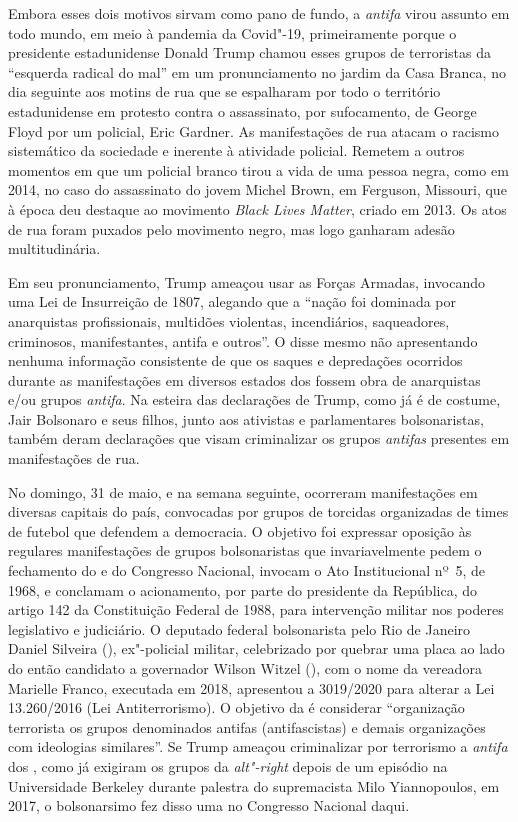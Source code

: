 Embora esses dois motivos sirvam como pano de fundo, a \emph{antifa}
virou assunto em todo mundo, em meio à pandemia da Covid"-19,
primeiramente porque o presidente estadunidense Donald Trump chamou
esses grupos de terroristas da ``esquerda radical do mal'' em um
pronunciamento no jardim da Casa Branca, no dia seguinte aos motins de
rua que se espalharam por todo o território estadunidense em protesto
contra o assassinato, por sufocamento, de George Floyd por um policial,
Eric Gardner. As manifestações de rua atacam o racismo sistemático da
sociedade e inerente à atividade policial. Remetem a outros momentos em
que um policial branco tirou a vida de uma pessoa negra, como em 2014,
no caso do assassinato do jovem Michel Brown, em Ferguson, Missouri, que
à época deu destaque ao movimento \emph{Black Lives Matter}, criado em
2013. Os atos de rua foram puxados pelo movimento negro, mas logo
ganharam adesão multitudinária.

Em seu pronunciamento, Trump ameaçou usar as Forças Armadas,
invocando uma Lei de Insurreição de 1807, alegando que a ``nação foi
dominada por anarquistas profissionais, multidões violentas,
incendiários, saqueadores, criminosos, manifestantes, antifa e outros''.
O disse mesmo não apresentando nenhuma informação consistente de que os
saques e depredações ocorridos durante as manifestações em diversos
estados dos  fossem obra de anarquistas e/ou grupos \emph{antifa}. Na
esteira das declarações de Trump, como já é de costume, Jair Bolsonaro e
seus filhos, junto aos ativistas e parlamentares bolsonaristas, também
deram declarações que visam criminalizar os grupos \emph{antifas}
presentes em manifestações de rua.

No domingo, 31 de maio, e na semana seguinte, ocorreram manifestações em
diversas capitais do país, convocadas por grupos de torcidas organizadas
de times de futebol que defendem a democracia. O objetivo foi expressar
oposição às regulares manifestações de grupos bolsonaristas que
invariavelmente pedem o fechamento do  e do Congresso Nacional,
invocam o Ato Institucional nº~5, de 1968, e conclamam o acionamento,
por parte do presidente da República, do artigo 142 da Constituição
Federal de 1988, para intervenção militar nos poderes legislativo e
judiciário. O deputado federal bolsonarista pelo Rio de Janeiro Daniel
Silveira (), ex"-policial militar, celebrizado por quebrar uma placa
ao lado do então candidato a governador Wilson Witzel (), com o nome
da vereadora Marielle Franco, executada em 2018, apresentou a 
3019/2020 para alterar a Lei 13.260/2016 (Lei Antiterrorismo). O
objetivo da  é considerar ``organização terrorista os grupos
denominados antifas (antifascistas) e demais organizações com ideologias
similares''. Se Trump ameaçou criminalizar por terrorismo a
\emph{antifa} dos , como já exigiram os grupos da \emph{alt"-right}
depois de um episódio na Universidade Berkeley durante palestra do
supremacista Milo Yiannopoulos, em 2017, o bolsonarsimo fez disso uma 
no Congresso Nacional daqui.

